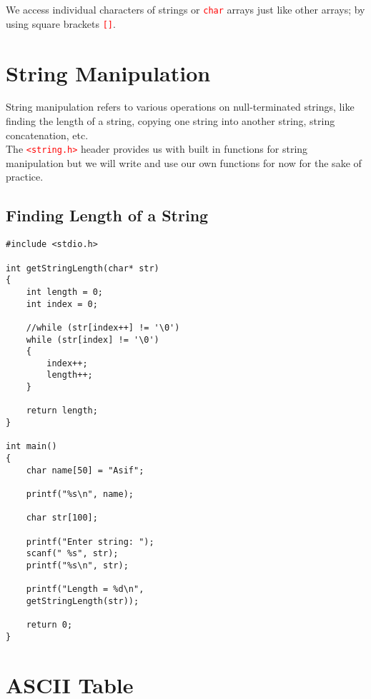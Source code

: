 \documentclass[12pt]{article}
\begin{document}
We access individual characters of strings or \textcolor{red}{\texttt{char}} arrays just like other arrays; by using square brackets \textcolor{red}{\texttt{[]}}.   

\section*{String Manipulation}

\noindent String manipulation refers to various operations on null-terminated strings, like finding the length of a string, copying one string into another string, string concatenation, etc. \\

\noindent The \textcolor{red}{\texttt{<string.h>}} header provides us with built in functions for string manipulation but we will write and use our own functions for now for the sake of practice. \\ 

\subsection*{Finding Length of a String}

\begin{verbatim}
#include <stdio.h>

int getStringLength(char* str)
{
    int length = 0;
    int index = 0;

    //while (str[index++] != '\0')
    while (str[index] != '\0')
    {
        index++;
        length++;
    }

    return length;
}

int main()
{
    char name[50] = "Asif";

    printf("%s\n", name);

    char str[100];

    printf("Enter string: ");
    scanf(" %s", str);
    printf("%s\n", str);

    printf("Length = %d\n", 
    getStringLength(str));

    return 0;
}

\end{verbatim}

\newpage
{}
\section*{ASCII Table}
\end{document}

